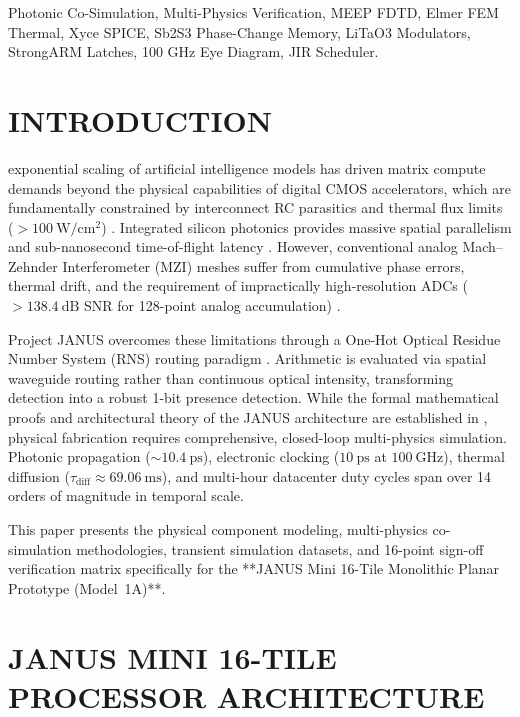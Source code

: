 \documentclass[journal]{IEEEtran}
\begin{document}
\begin{IEEEkeywords}
Photonic Co-Simulation, Multi-Physics Verification, MEEP FDTD, Elmer FEM Thermal, Xyce SPICE, Sb2S3 Phase-Change Memory, LiTaO3 Modulators, StrongARM Latches, 100 GHz Eye Diagram, JIR Scheduler.
\end{IEEEkeywords}

\section{INTRODUCTION}

 exponential scaling of artificial intelligence models has driven matrix compute demands beyond the physical capabilities of digital CMOS accelerators, which are fundamentally constrained by interconnect RC parasitics and thermal flux limits ($>100~\mathrm{W/cm^2}$) \cite{Miller2017}\cite{Shen2017}\cite{Feldmann2021}. Integrated silicon photonics provides massive spatial parallelism and sub-nanosecond time-of-flight latency \cite{Shastri2021}\cite{Bogaerts2020}. However, conventional analog Mach--Zehnder Interferometer (MZI) meshes suffer from cumulative phase errors, thermal drift, and the requirement of impractically high-resolution ADCs ($>138.4~\mathrm{dB}$ SNR for 128-point analog accumulation) \cite{Harris2018}\cite{Sinatkas2021}.

Project JANUS overcomes these limitations through a One-Hot Optical Residue Number System (RNS) routing paradigm \cite{Bhardwaj2026JANUS}\cite{Huang1979}\cite{Omosanya2021}. Arithmetic is evaluated via spatial waveguide routing rather than continuous optical intensity, transforming detection into a robust 1-bit presence detection. While the formal mathematical proofs and architectural theory of the JANUS architecture are established in \cite{Bhardwaj2026JANUS}, physical fabrication requires comprehensive, closed-loop multi-physics simulation. Photonic propagation ($\sim 10.4~\mathrm{ps}$), electronic clocking ($10~\mathrm{ps}$ at $100~\mathrm{GHz}$), thermal diffusion ($\tau_{\mathrm{diff}} \approx 69.06~\mathrm{ms}$), and multi-hour datacenter duty cycles span over 14 orders of magnitude in temporal scale.

This paper presents the physical component modeling, multi-physics co-simulation methodologies, transient simulation datasets, and 16-point sign-off verification matrix specifically for the **JANUS Mini 16-Tile Monolithic Planar Prototype (Model~1A)**.

\section{JANUS MINI 16-TILE PROCESSOR ARCHITECTURE}
\end{document}

